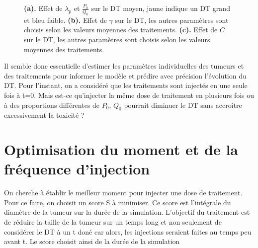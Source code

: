 \documentclass[12pt]{article}
\begin{document}
\begin{figure}
\begin{subfigure}[t]{0.45\textwidth}
        \caption{} \label{fig:effet_C}
    \end{subfigure}

    \caption{\textbf{(a).} Effet de $\lambda_{p}$ et $\frac{P_{0}}{Q_{0}}$ sur le DT moyen, jaune indique un DT grand et bleu faible. \textbf{(b).} Effet de $\gamma$ sur le DT, les autres paramètres sont choisis selon les valeurs moyennes des traitements. \textbf{(c).} Effet de $C$ sur le DT, les autres paramètres sont choisis selon les valeurs moyennes des traitements.}

\end{figure}
Il semble donc essentielle d'estimer les paramètres individuelles des tumeurs et des traitements pour informer le modèle et prédire avec précision l'évolution du DT. 
Pour l'instant, on a considéré que les traitements sont injectés en une seule fois à t=0.  Mais est-ce qu'injecter la même dose de traitement en plusieurs fois ou à des proportions différentes de $P_{0}$, $Q_{0}$ pourrait diminuer le DT sans accroître excessivement la toxicité ? 
\section{Optimisation du moment et de la fréquence d'injection}
On cherche à établir le meilleur moment pour injecter une dose de traitement. Pour ce faire, on choisit un score S à minimiser. Ce score est l'intégrale du diamètre de la tumeur sur la durée de la simulation. L'objectif du traitement est de réduire la taille de la tumeur sur un temps long et non seulement de considérer le DT à un t doné car alors, les injections seraient faites au temps peu avant t. Le score choisit ainsi de la durée de la simulation 
\end{document}
